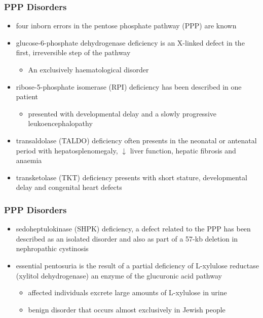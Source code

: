 \documentclass{scrartcl}
\begin{document}
\subsubsection{PPP Disorders}
\label{sec:org7d72912}

\begin{itemize}
\item four inborn errors in the pentose phosphate pathway (PPP) are known
\item glucose-6-phosphate dehydrogenase deficiency is an X-linked defect
in the first, irreversible step of the pathway
\begin{itemize}
\item An exclusively haematological disorder
\end{itemize}
\item ribose-5-phosphate isomerase (RPI) deficiency has been described in one patient
\begin{itemize}
\item presented with developmental delay and a slowly progressive leukoencephalopathy
\end{itemize}
\item transaldolase (TALDO) deficiency often presents in the neonatal or
antenatal period with hepatosplenomegaly, \(\downarrow\) liver function,
hepatic fibrosis and anaemia
\item transketolase (TKT) deficiency presents with short stature,
developmental delay and congenital heart defects
\end{itemize}

\subsubsection{PPP Disorders}
\label{sec:orga9ee278}
\begin{itemize}
\item sedoheptulokinase (SHPK) deficiency, a defect related to the PPP has
been described as an isolated disorder and also as part of a 57-kb
deletion in nephropathic cystinosis
\item essential pentosuria is the result of a partial deficiency of
L-xylulose reductase (xylitol dehydrogenase) an enzyme of the
glucuronic acid pathway
\begin{itemize}
\item affected individuals excrete large amounts of L-xylulose in urine
\item benign disorder that occurs almost exclusively in Jewish people
\end{itemize}
\end{itemize}
\end{document}
